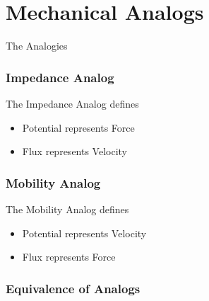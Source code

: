 \documentclass{../templates/topic}
\begin{document}
\chapter{Mechanical Analogs}

\begin{section}{The Analogies}
	\subsection{Impedance Analog}
		The Impedance Analog defines
		\begin{itemize}
			\item Potential represents Force
			\item Flux represents Velocity
		\end{itemize}

	\subsection{Mobility Analog}
		The Mobility Analog defines
		\begin{itemize}
			\item Potential represents Velocity
			\item Flux represents Force
		\end{itemize}
	\subsection{Equivalence of Analogs}

\end{section}
\end{document}
